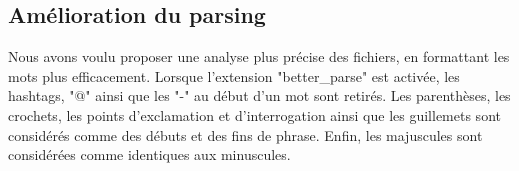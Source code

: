 \documentclass{article}
\begin{document}
\subsection{Amélioration du parsing}
Nous avons voulu proposer une analyse plus précise des fichiers, en formattant les mots plus efficacement. Lorsque l'extension "better\_parse" est activée, les hashtags, "@" ainsi que les "-" au début d'un mot sont retirés. Les parenthèses, les crochets, les points d'exclamation et d'interrogation ainsi que les guillemets sont considérés comme des débuts et des fins de phrase. Enfin, les majuscules sont considérées comme identiques aux minuscules.
\end{document}
